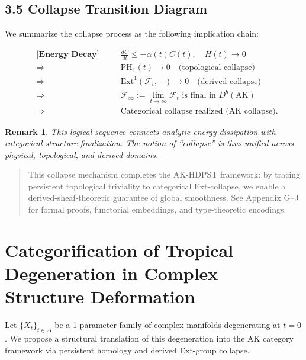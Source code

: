 \documentclass[11pt]{article}
\newtheorem{remark}[theorem]{Remark}
\begin{document}
\subsection{3.5 Collapse Transition Diagram}

We summarize the collapse process as the following implication chain:

\begin{align*}
&\textbf{[Energy Decay]} \quad && \frac{dC}{dt} \leq -\alpha(t) C(t), \quad H(t) \to 0 \\
&\Longrightarrow \quad && \mathrm{PH}_1(t) \to 0 \quad \text{(topological collapse)} \\
&\Longrightarrow \quad && \mathrm{Ext}^1(\mathcal{F}_t, -) \to 0 \quad \text{(derived collapse)} \\
&\Longrightarrow \quad && \mathcal{F}_\infty := \lim_{t \to \infty} \mathcal{F}_t \text{ is final in } D^b(\mathrm{AK}) \\
&\Longrightarrow \quad && \text{Categorical collapse realized (AK collapse).}
\end{align*}

\begin{remark}
This logical sequence connects analytic energy dissipation with categorical structure finalization. The notion of “collapse” is thus unified across physical, topological, and derived domains.
\end{remark}

\begin{quote}
This collapse mechanism completes the AK-HDPST framework:  
by tracing persistent topological triviality to categorical Ext-collapse,  
we enable a derived-sheaf-theoretic guarantee of global smoothness.  
See Appendix G–J for formal proofs, functorial embeddings, and type-theoretic encodings.
\end{quote}





\section{Categorification of Tropical Degeneration in Complex Structure Deformation}

Let \( \{X_t\}_{t \in \Delta} \) be a 1-parameter family of complex manifolds degenerating at \( t=0 \).  
We propose a structural translation of this degeneration into the AK category framework via persistent homology and derived Ext-group collapse.
\end{document}
